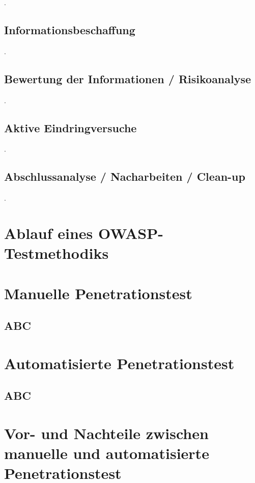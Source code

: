 \cite[100-101]{pt03bsi}.

\subsection{Informationsbeschaffung}

\cite[102-103]{pt03bsi}.

\subsection{Bewertung der Informationen / Risikoanalyse}

\cite[103-104]{pt03bsi}.

\subsection{Aktive Eindringversuche}

\cite[104-105]{pt03bsi}.

\subsection{Abschlussanalyse / Nacharbeiten / Clean-up}

\cite[105-106]{pt03bsi}.

\section{Ablauf eines OWASP-Testmethodiks}

\section{Manuelle Penetrationstest}

\subsection{ABC}

\section{Automatisierte Penetrationstest}

\subsection{ABC}

\section{Vor- und Nachteile zwischen manuelle und automatisierte Penetrationstest}